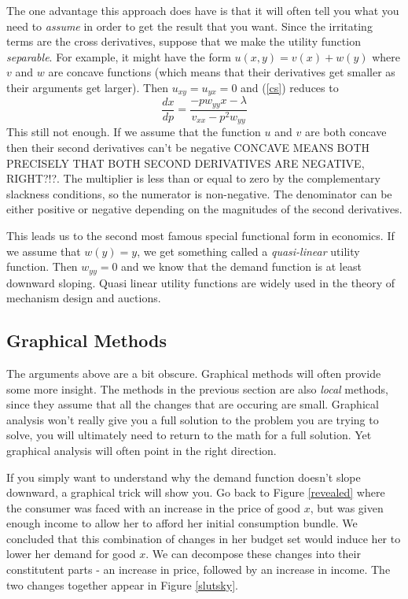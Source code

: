 \documentclass[12pt]{article}
\newcommand{\tmem}[1]{\textit{#1}}
\begin{document}
The one advantage this approach does have is that it will often tell you what
you need to {\tmem{assume}} in order to get the result that you want. Since
the irritating terms are the cross derivatives, suppose that we make the
utility function {\tmem{separable}}. For example, it might have the form $u (
x, y ) = v ( x ) + w ( y )$ where $v$ and $w$ are concave functions (which
means that their derivatives get smaller as their arguments get larger). Then
$u_{x y} = u_{y x} = 0$ and (\ref{cs}) reduces to
\begin{equation}
  \frac{d x}{d p} = \frac{- p w_{y y} x - \lambda}{v_{x x} - p^2 w_{y y}}
\end{equation}
This still not enough. If we assume that the function $u$ and $v$ are both
concave then their second derivatives can't be negative CONCAVE MEANS BOTH PRECISELY THAT BOTH SECOND DERIVATIVES ARE NEGATIVE, RIGHT?!?. The multiplier is
less than or equal to zero by the complementary slackness conditions, so the
numerator is non-negative. The denominator can be either positive or negative
depending on the magnitudes of the second derivatives.

This leads us to the second most famous special functional form in economics.
If we assume that $w ( y ) = y$, we get something called a
{\tmem{quasi-linear}} utility function. Then $w_{y y} = 0$ and we know that
the demand function is at least downward sloping. Quasi linear utility
functions are widely used in the theory of mechanism design and auctions.

\subsection{Graphical Methods}

The arguments above are a bit obscure. Graphical methods will often provide
some more insight. The methods in the previous section are also {\tmem{local}}
methods, since they assume that all the changes that are occuring are small.
Graphical analysis won't really give you a full solution to the problem you
are trying to solve, you will ultimately need to return to the math for a full
solution. Yet graphical analysis will often point in the right direction.

If you simply want to understand why the demand function doesn't slope
downward, a graphical trick will show you. Go back to Figure \ref{revealed}
where the consumer was faced with an increase in the price of good $x$, but
was given enough income to allow her to afford her initial consumption bundle.
We concluded that this combination of changes in her budget set would induce
her to lower her demand for good $x$. We can decompose these changes into
their constitutent parts - an increase in price, followed by an increase in
income. The two changes together appear in Figure \ref{slutsky}.
\end{document}
